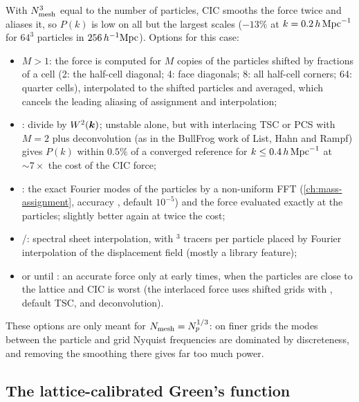 With $N_{\rm mesh}^3$ equal to the number of particles, CIC smooths the force twice and aliases it, so $P(k)$ is low on
all but the largest scales ($-13\%$ at $k=0.2\,h\,\mathrm{Mpc}^{-1}$ for $64^3$ particles in $256\,h^{-1}\mathrm{Mpc}$). Options for this case:
\begin{itemize}
\item {} $M>1$: the force is computed for $M$ copies of the particles shifted by fractions of
      a cell (2: the half-cell diagonal; 4: face diagonals; 8: all half-cell corners; 64: quarter cells), interpolated
      to the shifted particles and averaged, which cancels the leading aliasing of assignment and interpolation;
\item {}: divide by $W^2(\bm{k})$; unstable alone, but with interlacing TSC or PCS with $M=2$
      plus deconvolution (as in the BullFrog work of List, Hahn and Rampf) gives $P(k)$ within $0.5\%$ of a converged
      reference for $k\le0.4\,h\,\mathrm{Mpc}^{-1}$ at $\sim7\times$ the cost of the CIC force;
\item {} : the exact Fourier modes of the particles by a non-uniform FFT
      (\cref{ch:mass-assignment}, accuracy , default $10^{-5}$) and the force evaluated
      exactly at the particles; slightly better again at twice the cost;
\item {}/: spectral sheet interpolation, with $^3$ tracers per
      particle placed by Fourier interpolation of the displacement field (mostly a library feature);
\item {}  or  until : an
      accurate force only at early times, when the particles are close to the lattice and CIC is worst (the interlaced
      force uses  shifted grids with ,
      default TSC, and deconvolution).
\end{itemize}
These options are only meant for $N_{\rm mesh}=N_p^{1/3}$: on finer grids the modes between the particle and grid
Nyquist frequencies are dominated by discreteness, and removing the smoothing there gives far too much power.

\subsection{The lattice-calibrated Green's function}

